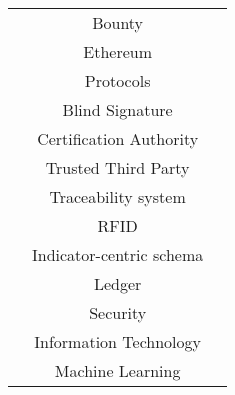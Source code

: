 \begin{longtable}{ |c|c|p{4cm}| }
	 & Bounty & \multirow{2}{*}{\cite{2016_Jacynycz}} \\ \cline{2-2}
	 & Ethereum & \\ \cline{2-3}
	 & Protocols & \cite{2016_Kianmajd} \\ \cline{2-3}
	 & Blind Signature & \multirow{3}{*}{\cite{2016_Schaub}} \\ \cline{2-2}
	 & Certification Authority & \\ \cline{2-2}
	 & Trusted Third Party & \\ \cline{2-3}
	 & Traceability system & \multirow{2}{*}{\cite{2016_Tian}} \\ \cline{2-2}
	 & RFID & \\ \cline{2-3}
	 & Indicator-centric schema & \cite{2016_Yue} \\ \cline{2-3}
	 & Ledger & \cite{2017_Coyne} \\ \cline{2-3}
	 & Security & \cite{2017_Ouaddah} \\ \cline{2-3}
	 & Information Technology & \multirow{2}{*}{\cite{2018_Alessandra}}\\ \cline{2-2}
	 & Machine Learning & \\
	 \hline
\end{longtable}

